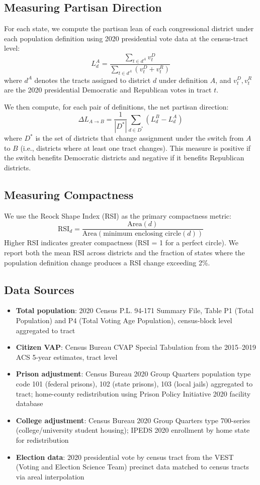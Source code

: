 \subsection{Measuring Partisan Direction}

For each state, we compute the partisan lean of each congressional district under each population definition using 2020 presidential vote data at the census-tract level:
\[
L_d^A = \frac{\sum_{t \in d^A} v_t^D}{\sum_{t \in d^A} (v_t^D + v_t^R)}
\]
where $d^A$ denotes the tracts assigned to district $d$ under definition $A$, and $v_t^D, v_t^R$ are the 2020 presidential Democratic and Republican votes in tract $t$.

We then compute, for each pair of definitions, the net partisan direction:
\[
\Delta L_{A \to B} = \frac{1}{|D^*|} \sum_{d \in D^*} \left( L_d^B - L_d^A \right)
\]
where $D^*$ is the set of districts that change assignment under the switch from $A$ to $B$ (i.e., districts where at least one tract changes). This measure is positive if the switch benefits Democratic districts and negative if it benefits Republican districts.

\subsection{Measuring Compactness}

We use the Reock Shape Index (RSI) as the primary compactness metric:
\[
\text{RSI}_d = \frac{\text{Area}(d)}{\text{Area}(\text{minimum enclosing circle}(d))}
\]
Higher RSI indicates greater compactness (RSI = 1 for a perfect circle). We report both the mean RSI across districts and the fraction of states where the population definition change produces a RSI change exceeding 2\%.

\subsection{Data Sources}

\begin{itemize}
    \item \textbf{Total population}: 2020 Census P.L. 94-171 Summary File, Table P1 (Total Population) and P4 (Total Voting Age Population), census-block level aggregated to tract
    \item \textbf{Citizen VAP}: Census Bureau CVAP Special Tabulation from the 2015--2019 ACS 5-year estimates, tract level
    \item \textbf{Prison adjustment}: Census Bureau 2020 Group Quarters population type code 101 (federal prisons), 102 (state prisons), 103 (local jails) aggregated to tract; home-county redistribution using Prison Policy Initiative 2020 facility database
    \item \textbf{College adjustment}: Census Bureau 2020 Group Quarters type 700-series (college/university student housing); IPEDS 2020 enrollment by home state for redistribution
    \item \textbf{Election data}: 2020 presidential vote by census tract from the VEST (Voting and Election Science Team) precinct data matched to census tracts via areal interpolation
\end{itemize}
